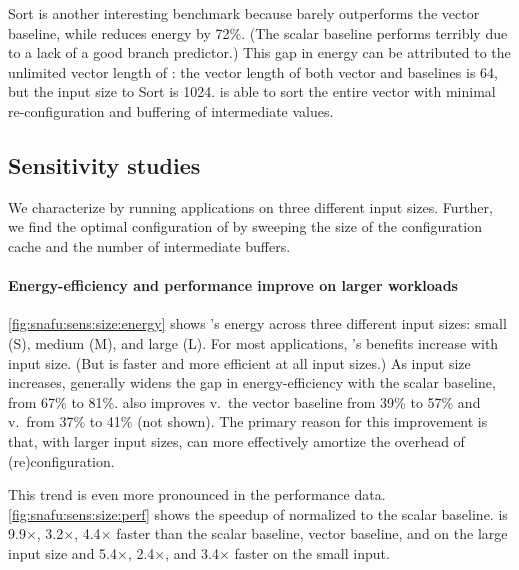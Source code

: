 Sort is another interesting benchmark because \manic barely outperforms the vector baseline, while \snafuarch reduces energy by 72\%.
(The scalar baseline performs terribly due to a lack of a good branch predictor.)
% 
This gap in energy can be attributed to the unlimited vector length of \snafuarch:
% 
the vector length of both vector and \manic baselines is 64, but the input size to Sort is 1024.
% 
\snafuarch is able to sort the entire vector with minimal re-configuration
and buffering of intermediate values.

\subsection{Sensitivity studies}
We characterize \snafuarch by running applications on three different input sizes. %
% 
Further, we find the optimal configuration of \snafuarch by sweeping the size of the configuration cache %
and the number of intermediate buffers. %


\paragraph{Energy-efficiency and performance improve on larger workloads}
\autoref{fig:snafu:sens:size:energy} shows \snafuarch's energy across three different input sizes: small (S), medium (M), and large (L). 
%
For most applications, \snafuarch's benefits increase with input size.
(But \snafuarch is faster and more efficient at all input sizes.)
%
As input size increases, \snafuarch generally widens the gap in energy-efficiency with the scalar baseline, from 67\% to 81\%.
%
\snafuarch also improves v.\ the vector baseline from 39\% to 57\% and v.\ \manic from 37\% to 41\% (not shown).
% 
The primary reason for this improvement is that, with larger input sizes, \snafuarch can more effectively amortize the overhead of (re)configuration.
% 

This trend is even more pronounced in the performance data.
% 
\autoref{fig:snafu:sens:size:perf} shows the speedup of \snafuarch normalized to the scalar baseline.
%
\snafuarch is 9.9$\times$, 3.2$\times$, 4.4$\times$ faster than the scalar baseline, vector baseline, and \manic on the large input size and 5.4$\times$, 2.4$\times$, and 3.4$\times$ faster on the small input.

